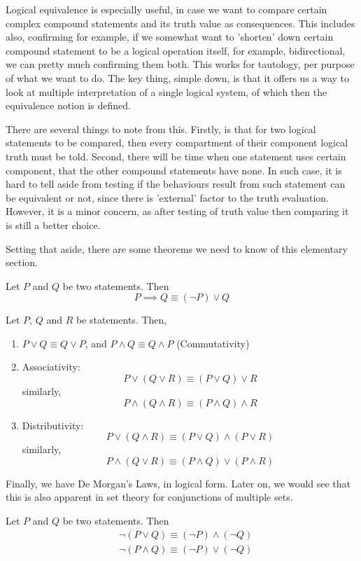 Logical equivalence is especially useful, in case we want to compare certain complex compound statements and its truth value as consequences. This includes also, confirming for example, if we somewhat want to 'shorten' down certain compound statement to be a logical operation itself, for example, bidirectional, we can pretty much confirming them both. This works for tautology, per purpose of what we want to do. The key thing, simple down, is that it offers us a way to look at multiple interpretation of a single logical system, of which then the equivalence notion is defined. 

There are several things to note from this. Firstly, is that for two logical statements to be compared, then every compartment of their component logical truth must be told. Second, there will be time when one statement uses certain component, that the other compound statements have none. In such case, it is hard to tell aside from testing if the behaviours result from such statement can be equivalent or not, since there is 'external' factor to the truth evaluation. However, it is a minor concern, as after testing of truth value then comparing it is still a better choice. 

Setting that aside, there are some theorems we need to know of this elementary section. 

\begin{theorem}[Equivalencing]
    Let $P$ and $Q$ be two statements. Then 
    \begin{equation*}
        P \implies Q \equiv (\lnot P) \lor Q
    \end{equation*}
\end{theorem}

\begin{theorem}
    Let $P$, $Q$ and $R$ be statements. Then, 
    \begin{enumerate}
        \item $P \lor Q \equiv Q \lor P$, and $P \land Q \equiv Q \land P$ (Commutativity)
        \item Associativity: \[P \lor (Q \lor R) \equiv (P \lor Q) \lor R\] similarly, \[P \land (Q \land R) \equiv (P \land Q) \land R\]
        \item Distributivity: \[P \lor (Q \land R) \equiv (P \lor Q)\land (P \lor R)\] similarly, \[P \land (Q \lor R) \equiv (P\land Q) \lor (P\land R)\]
    \end{enumerate}
\end{theorem}

Finally, we have De Morgan's Laws, in logical form. Later on, we would see that this is also apparent in set theory for conjunctions of multiple sets.  
\begin{theorem}[De Morgan]
    Let $P$ and $Q$ be two statements. Then
    \begin{align}
        & \lnot (P \lor Q) \equiv (\lnot P) \land (\lnot Q) \\
        & \lnot (P \land Q) \equiv (\lnot P) \lor (\lnot Q)
    \end{align}
\end{theorem}

